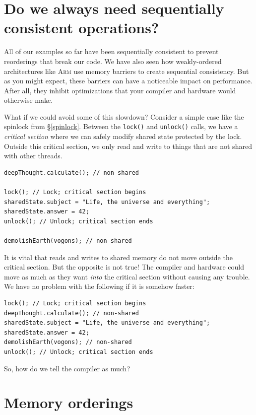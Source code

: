 \documentclass[fontsize=10pt, oneside]{scrartcl}
\newcommand{\codesize}{\fontsize{\bodyfontsize}{\bodybaselineskip}}
\newcommand{\introduce}[1]{\textit{#1}}
\newcommand{\secref}[1]{\hyperref[#1]{\textsc{\S}\ref*{#1}}}
\newenvironment{colfigure}
  {\par\vspace{1\baselineskip minus 0.5\baselineskip}\noindent\minipage{\linewidth}}
  {\endminipage\vspace{1\baselineskip minus 0.7\baselineskip}}
\begin{document}
\section{Do we always need sequentially consistent operations?}
\label{lock-example}

All of our examples so far have been sequentially consistent to prevent reorderings that break our code.
We have also seen how weakly-ordered architectures like \textsc{Arm} use memory barriers to create sequential consistency.
But as you might expect,
these barriers can have a noticeable impact on performance.
After all,
they inhibit optimizations that your compiler and hardware would otherwise make.

What if we could avoid some of this slowdown?
Consider a simple case like the spinlock from \secref{spinlock}.
Between the \texttt{lock()} and \texttt{unlock()} calls,
we have a \introduce{critical section} where we can safely modify shared state protected by the lock.
Outside this critical section,
we only read and write to things that are not shared with other threads.
\begin{colfigure}
\begin{verbatim}
deepThought.calculate(); // non-shared

lock(); // Lock; critical section begins
sharedState.subject = "Life, the universe and everything";
sharedState.answer = 42;
unlock(); // Unlock; critical section ends

demolishEarth(vogons); // non-shared
\end{verbatim}
\end{colfigure}

It is vital that reads and writes to shared memory do not move outside the critical section.
But the opposite is not true!
The compiler and hardware could move as much as they want \emph{into} the critical section without causing any trouble.
We have no problem with the following if it is somehow faster:
\begin{colfigure}
\begin{verbatim}
lock(); // Lock; critical section begins
deepThought.calculate(); // non-shared
sharedState.subject = "Life, the universe and everything";
sharedState.answer = 42;
demolishEarth(vogons); // non-shared
unlock(); // Unlock; critical section ends
\end{verbatim}
\end{colfigure}
So, how do we tell the compiler as much?

\section{Memory orderings}
\end{document}
